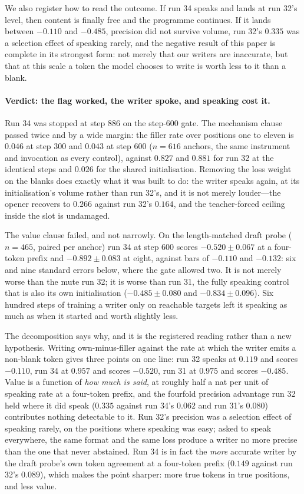 \documentclass{article} %
\begin{document}
We also register how to read the outcome. If run 34 speaks and lands at run 32's level, then
content is finally free and the programme continues. If it lands between $-0.110$ and
$-0.485$, precision did not survive volume, run 32's $0.335$ was a selection effect of
speaking rarely, and the negative result of this paper is complete in its strongest form: not
merely that our writers are inaccurate, but that at this scale a token the model chooses to
write is worth less to it than a blank.


\paragraph{Verdict: the flag worked, the writer spoke, and speaking cost it.}
Run 34 was stopped at step $886$ on the step-$600$ gate. The mechanism clause passed twice and
by a wide margin: the filler rate over positions one to eleven is $0.046$ at step $300$ and
$0.043$ at step $600$ ($n{=}616$ anchors, the same instrument and invocation as every control),
against $0.827$ and $0.881$ for run 32 at the identical steps and $0.026$ for the shared
initialisation. Removing the loss weight on the blanks does exactly what it was built to do:
the writer speaks again, at its initialisation's volume rather than run 32's, and it is not
merely louder---the opener recovers to $0.266$ against run 32's $0.164$, and the teacher-forced
ceiling inside the slot is undamaged.

The value clause failed, and not narrowly. On the length-matched draft probe ($n{=}465$, paired
per anchor) run 34 at step $600$ scores $-0.520 \pm 0.067$ at a four-token prefix and
$-0.892 \pm 0.083$ at eight, against bars of $-0.110$ and $-0.132$: six and nine standard errors
below, where the gate allowed two. It is not merely worse than the mute run 32; it is worse than
run 31, the fully speaking control that is also its own initialisation ($-0.485 \pm 0.080$ and
$-0.834 \pm 0.096$). Six hundred steps of training a writer only on reachable targets left it
speaking as much as when it started and worth slightly less.

The decomposition says why, and it is the registered reading rather than a new hypothesis.
Writing own-minus-filler against the rate at which the writer emits a non-blank token gives
three points on one line: run 32 speaks at $0.119$ and scores $-0.110$, run 34 at $0.957$ and
scores $-0.520$, run 31 at $0.975$ and scores $-0.485$. Value is a function of \emph{how much is
said}, at roughly half a nat per unit of speaking rate at a four-token prefix, and the fourfold
precision advantage run 32 held where it did speak ($0.335$ against run 34's $0.062$ and run
31's $0.080$) contributes nothing detectable to it. Run 32's precision was a selection effect of
speaking rarely, on the positions where speaking was easy; asked to speak everywhere, the same
format and the same loss produce a writer no more precise than the one that never abstained.
Run 34 is in fact the \emph{more} accurate writer by the draft probe's own token agreement at a
four-token prefix ($0.149$ against run 32's $0.089$), which makes the point sharper: more true
tokens in true positions, and less value.
\end{document}
